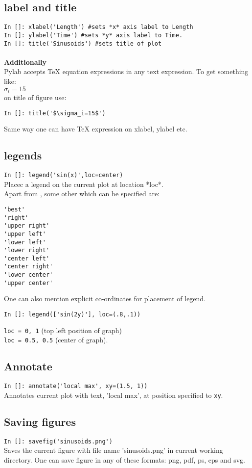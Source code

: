 \documentclass[12pt]{article}
\newcommand{\typ}[1]{\lstinline{#1}}
\begin{document}
\subsection{label and title}
\typ{In []: xlabel('Length') #sets *x* axis label to Length}\\ 
\typ{In []: ylabel('Time') #sets *y* axis label to Time.}\\
\typ{In []: title('Sinusoids') #sets title of plot}\\
\\
\textbf{Additionally}\\
Pylab accepts TeX equation expressions in any text expression. To get something like:\\
$\sigma_i=15$ \\
on title of figure use: 
\begin{lstlisting}
In []: title('$\sigma_i=15$')
\end{lstlisting}  
Same way one can have TeX expression on xlabel, ylabel etc.

\subsection{legends}
\typ{In []: legend('sin(x)',loc=center)} \\
Placec a legend on the current plot at location *loc*.\\
Apart from , some other  which can be specified are:
\begin{lstlisting}
'best'
'right'
'upper right'
'upper left'      
'lower left'      
'lower right'     
'center left'     
'center right'    
'lower center'    
'upper center'    
\end{lstlisting}
\newpage
One can also mention explicit co-ordinates for placement of legend. 
\begin{lstlisting}
In []: legend(['sin(2y)'], loc=(.8,.1)) 
\end{lstlisting}
\typ{loc = 0, 1} (top left position of graph)\\
\typ{loc = 0.5, 0.5} (center of graph).

\subsection{Annotate}
\typ{In []: annotate('local max', xy=(1.5, 1))}\\
Annotates current plot with text, 'local max', at position specified to \typ{xy}.

\subsection{Saving figures}
\typ{In []: savefig('sinusoids.png')}\\
Saves the current figure with file name 'sinusoids.png' in current working directory. One can save figure in any of these formats: png, pdf, ps, eps and svg.
\end{document}
